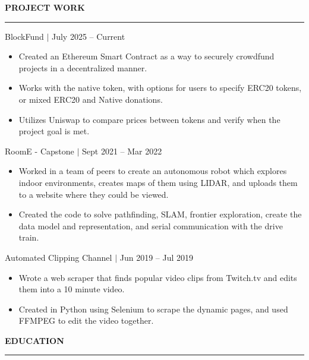 \documentclass[12pt]{article}
\newcommand{\sectionRule}{\textcolor{gray}{\rule{7.27in}{0.02cm}}}
\newcommand{\sectionTxt}[1]{\noindent\textbf{#1}\\}
\newcommand{\projText}[2]{\noindent#1 $|$ {\color{textGray} #2}}
\begin{document}
    \newpage

    \sectionTxt{PROJECT WORK}
    \sectionRule
    
    \projText{BlockFund}{July 2025 -- Current}
    \begin{small}
        \begin{itemize}
            \itemsep0em 
            \item {Created an Ethereum Smart Contract as a way to securely crowdfund projects in a decentralized manner.}
            \item {Works with the native token, with options for users to specify ERC20 tokens, or mixed ERC20 and Native donations.}
            \item {Utilizes Uniswap to compare prices between tokens and verify when the project goal is met.}
        \end{itemize}
    \end{small}

    \projText{RoomE - Capstone}{Sept 2021 -- Mar 2022}
    \begin{small}
        \begin{itemize}
            \itemsep0em 
            \item {Worked in a team of peers to create an autonomous robot which explores indoor environments, creates maps of them using LIDAR, and uploads them to a website where they could be viewed.}
            \item {Created the code to solve pathfinding, SLAM, frontier exploration, create the data model and representation, and serial communication with the drive train. }
        \end{itemize}
    \end{small}

    \projText{Automated Clipping Channel}{Jun 2019 -- Jul 2019}
    \begin{small}
        \begin{itemize}
            \itemsep0em
            \item {Wrote a web scraper that finds popular video clips from Twitch.tv and edits them into a 10 minute video.}
            \item {Created in Python using Selenium to scrape the dynamic pages, and used FFMPEG to edit the video together.}
        \end{itemize}
    \end{small}

    \sectionTxt{EDUCATION}
    \sectionRule
\end{document}
